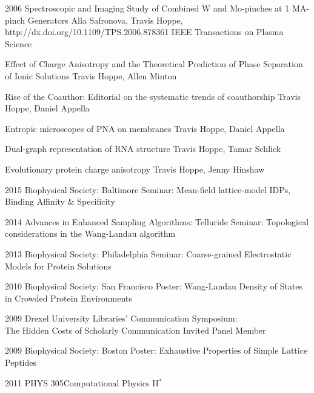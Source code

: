 \documentclass[]{scrartcl}
\begin{document}
\begin{cleanCV}
\Paper
{2006}
{Spectroscopic and Imaging Study of Combined W and Mo-pinches 
  at 1 MA-pinch Generators}
{Alla Safronova, Travis Hoppe, \etal}
{http://dx.doi.org/10.1109/TPS.2006.878361}
{IEEE Transactions on Plasma Science}



\PaperX
{Effect of Charge Anisotropy and the Theoretical Prediction of Phase Separation of Ionic Solutions}
{Travis Hoppe, Allen Minton}

\PaperX
{Rise of the Coauthor: Editorial on the systematic trends of coauthorship}
{Travis Hoppe, Daniel Appella}

\PaperX
{Entropic microscopes of PNA on membranes}
{Travis Hoppe, Daniel Appella}

\PaperX
{Dual-graph representation of RNA structure}
{Travis Hoppe, Tamar Schlick}


\PaperX
{Evolutionary protein charge anisotropy}
{Travis Hoppe, Jenny Hinshaw}


\WorkExperienceX
{2015}
{Biophysical Society: {Baltimore}}
{Seminar: Mean-field lattice-model IDPs, Binding Affinity \& Specificity}

\WorkExperienceX
{2014}
{Advances in Enhanced Sampling Algorithms: {Telluride}}
{Seminar: Topological considerations in the Wang-Landau algorithm}

\WorkExperienceX
{2013}
{Biophysical Society: {Philadelphia}}
{Seminar: Coarse-grained Electrostatic Models for Protein Solutions}

\WorkExperienceX
{2010}
{Biophysical Society: San Francisco}
{Poster: Wang-Landau Density of States in Crowded Protein Environments}

\WorkExperienceX
{2009}
{Drexel University Libraries' Communication Symposium:\\The Hidden Costs of Scholarly Communication}
{Invited Panel Member}

\WorkExperienceX
{2009}
{Biophysical Society: {Boston}}
{Poster: Exhaustive Properties of Simple Lattice Peptides}

\pagebreak


\newcommand{\TeachingNote}{$^*$}

\Teaching
{2011}
{PHYS 305}{Computational Physics II\TeachingNote}


\end{cleanCV}
\end{document}
